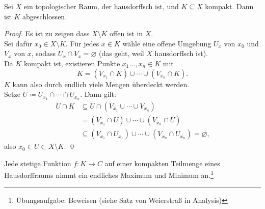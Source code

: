 \begin{lemma}
  Sei \( X \) ein topologischer Raum, der hausdorffsch ist, und \( K \subseteq X \) kompakt. Dann ist \( K \) abgeschlossen.
  \begin{proof}
    Es ist zu zeigen dass \( X \setminus K \) offen ist in \( X \). \\
    Sei dafür \( x_0 \in X \setminus K \). Für jedes \( x \in K \) wähle eine offene Umgebung \( U_x \) von \( x_0 \) und \( V_x \) von \( x \), sodass \( U_x \cap V_x = \varnothing \) (das geht, weil \( X \) hausdorffsch ist). \\
    Da \( K \) kompakt ist, existieren Punkte \( x_1 \dots, x_n \in K \) mit
    \begin{equation*}
      K = (V_{x_1} \cap K) \cup \cdots \cup (V_{x_n} \cap K)\text{.}
    \end{equation*}
    \( K \) kann also durch endlich viele Mengen überdeckt werden. \\
    Setze \( U \coloneqq U_{x_1} \cap \cdots \cap U_{x_n} \). Dann gilt:
    \begin{align*}
      U \cap K &\subseteq U \cap (V_{x_1} \cup \cdots \cup V_{x_n}) \\
       &= (V_{x_1} \cap U) \cup \cdots \cup (V_{x_n} \cap U) \\
       &\subseteq (V_{x_1} \cap U_{x_1}) \cup \cdots \cup (V_{x_n} \cap U_{x_n}) = \varnothing\text{,}
    \end{align*}
    also \( x_0 \in U \subset X \setminus K \). \qed{}
  \end{proof}
\end{lemma}

\begin{corollary}
  Jede stetige Funktion \( f : K \to C \) auf einer kompakten Teilmenge eines Hausdorffraums nimmt ein endliches Maximum und Minimum an.\footnote{Übungsaufgabe: Beweisen (siehe Satz von Weierstraß in Analysis)}
\end{corollary}

